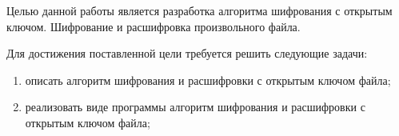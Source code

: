 %
%
%


Целью данной работы является разработка алгоритма шифрования с открытым ключом. Шифрование и расшифровка произвольного файла. 


Для достижения поставленной цели требуется решить следующие задачи:
\begin{enumerate}[label={\arabic*)}]
	\item описать алгоритм шифрования и расшифровки с открытым ключом файла;
	\item реализовать виде программы алгоритм шифрования и расшифровки с открытым ключом файла;
\end{enumerate}


\clearpage
